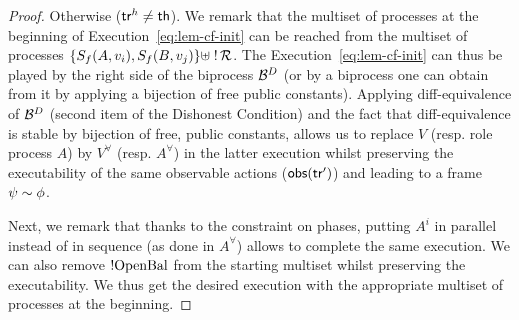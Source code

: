 \begin{proof}
Otherwise (\ie $\mathsf{tr}^h\neq\mathsf{th}$). We remark that the multiset of processes
at the beginning of Execution~\ref{eq:lem-cf-init} can be reached
from the multiset of processes
$\{S_f(A,v_i),S_f(B,v_j)\} \uplus \;!\,\mathcal{R}$.
The Execution~\ref{eq:lem-cf-init} can thus be played by the right side of the biprocess
$\mathcal{B}^{D}$ (or by a biprocess one can obtain from it by applying a bijection of free public constants).
%
Applying diff-equivalence of $\mathcal{B}^D$ (\ie second item of the Dishonest Condition)
and the fact that diff-equivalence is stable by bijection of free, public constants,
allows us to replace $V$ (resp. role process $A$) by
$V^\forall$ (resp. $A^\forall$) in the latter execution whilst preserving the executability
of the same observable actions (\ie $\mathsf{obs}(\mathsf{tr}')$) and leading to a frame $\psi\sim\phi$.


Next, we remark that thanks to the constraint on phases, putting
$A^i$ in parallel instead of in sequence (as done in $A^\forall$)
allows to complete the same execution.
We can also remove $!\mathrm{OpenBal}$ from the starting multiset whilst preserving
the executability.
We thus get the desired execution with the appropriate multiset of processes at
the beginning.
\smallskip{}


\end{proof}
